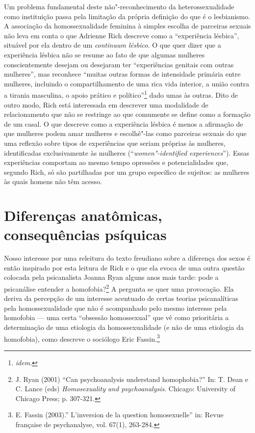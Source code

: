 Um problema fundamental deste não"-reconhecimento da heterossexualidade
como instituição passa pela limitação da própria definição do que é o
lesbianismo. A associação da homossexualidade feminina à simples escolha
de parceiras sexuais não leva em conta o que Adrienne Rich descreve como
a ``experiência lésbica'', situável por ela dentro de um \emph{continuum
lésbico.} O que quer dizer que a experiência lésbica não se resume ao
fato de que algumas mulheres conscientemente desejam ou desejaram ter
``experiências genitais com outras mulheres'', mas reconhece ``muitas
outras formas de intensidade primária entre mulheres, incluindo o
compartilhamento de uma rica vida interior, a união contra a tirania
masculina, o apoio prático e político''\footnote{\emph{idem}.} dado umas
às outras. Dito de outro modo, Rich está interessada em descrever uma
modalidade de relacionamento que não se restringe ao que comumente se
define como a formação de um casal. O que descreve como a experiência
lésbica é menos a afirmação de que mulheres podem amar mulheres e
escolhê"-las como parceiras sexuais do que uma reflexão sobre tipos de
experiências que seriam próprias às mulheres, identificadas
exclusivamente às mulheres (``\emph{women"-identified experiences}'').
Essas experiências comportam ao mesmo tempo opressões e potencialidades
que, segundo Rich, só são partilhadas por um grupo específico de
sujeitos: as mulheres às quais homens não têm acesso.

\section{Diferenças anatômicas, consequências psíquicas}

Nosso interesse por uma releitura do texto freudiano sobre a diferença
dos sexos é então inspirado por esta leitura de Rich e o que ela evoca
de uma outra questão colocada pela psicanalista Joanna Ryan alguns anos
mais tarde: pode a psicanálise entender a homofobia?\footnote{J. Ryan
  (2001) ``Can psychoanalysis understand homophobia?'' In: T. Dean e C.
  Lance (eds) \emph{Homosexuality and psychoanalysis}. Chicago:
  University of Chicago Press; p. 307-321.} A pergunta se quer uma
provocação. Ela deriva da percepção de um interesse acentuado de certas
teorias psicanalíticas pela homossexualidade que não é acompanhado pelo
mesmo interesse pela homofobia --- uma certa ``obsessão homossexual'' que
vê como prioritária a determinação de uma etiologia da homossexualidade
(e não de uma etiologia da homofobia), como descreve o sociólogo Eric
Fassin.\footnote{E. Fassin (2003).'' L'inversion de la question
  homosexuelle'' in: Revue française de psychanalyse, vol. 67(1),
  263-284.}

